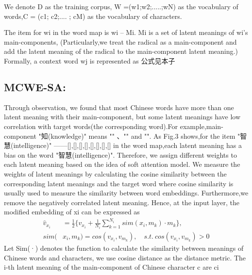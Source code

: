\documentclass[runningheads]{llncs}
\begin{document}
We denote D as the training corpus, W =(w1;w2;.....;wN) as the vocabulary of words,C = (c1; c2;.... ; cM) as the vocabulary of characters. 

The item for wi in the word map is wi -- Mi. Mi is a set of latent meanings of wi's main-components, 
(Particularly,we treat the radical as a main-component and add the latent meaning of the radical to the main-component latent meaning.)
Formally, a context word wj is represented as
公式见本子

\subsection{MCWE-SA:}
Through observation, we found that most Chinese words have more than one latent meaning with their main-component,
but some latent meanings have low correlation with target words(the corresponding word).For example,main-component "知(knowledge)" means "" 、"" and "".
As Fig.3 shows,for the item "智慧(intelligence)" ——{[],[],[],[],[],[],[],[]} in the word map,each latent meaning has a bias on the word "智慧(intelligence)".
Therefore, we assign different weights to each latent meaning based on the idea of soft attention model.
We measure the weights of latent meanings by calculating the cosine similarity between the corresponding latent meanings and the target word where cosine similarity is usually used to measure the similarity between word embeddings.
Furthermore,we remove the negatively correlated latent meaning.
Hence, at the input layer, the modified embedding of xi can be expressed as
\begin{equation}
\begin{aligned}
\hat v_{x_{i}} &= \frac{1}{2}\{v_{x_{i}}+\frac{1}{N_i}\sum_{k=1}^{N_i}sim(x_i,m_k)\cdot m_k  \},\\
sim(&x_i,m_k)=cos(v_{x_i},v_{m_k}), \quad  s.t. \    cos(v_{x_i},v_{m_k}) > 0
\end{aligned}
\end{equation}
Let Sim(·) denotes the function to calculate the similarity between meanings of Chinese words and characters, we use cosine distance as the distance metric.
The i-th latent meaning of the main-component of Chinese character c are ci
\end{document}
